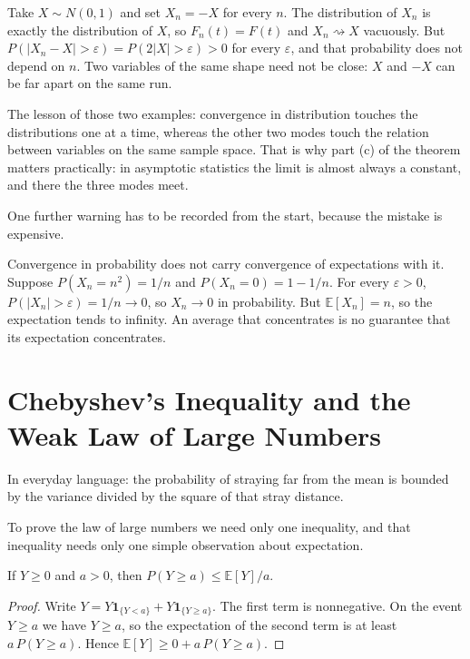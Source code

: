 \begin{contoh}
Take $X\sim N(0,1)$ and set $X_n=-X$ for every $n$. The distribution of $X_n$ is
exactly the distribution of $X$, so $F_n(t)=F(t)$ and $X_n\rightsquigarrow X$
vacuously. But $P(|X_n-X|>\varepsilon)=P(2|X|>\varepsilon)>0$ for every
$\varepsilon$, and that probability does not depend on $n$. Two variables of the
same shape need not be close: $X$ and $-X$ can be far apart on the same run.
\end{contoh}

The lesson of those two examples: convergence in distribution touches the
distributions one at a time, whereas the other two modes touch the relation between
variables on the same sample space. That is why part (c) of the theorem matters
practically: in asymptotic statistics the limit is almost always a constant, and
there the three modes meet.

One further warning has to be recorded from the start, because the mistake is
expensive.

\begin{catatan}
Convergence in probability does not carry convergence of expectations with it.
Suppose $P(X_n=n^2)=1/n$ and $P(X_n=0)=1-1/n$. For every $\varepsilon>0$,
$P(|X_n|>\varepsilon)=1/n\to0$, so $X_n\to0$ in probability. But
$\mathbb{E}[X_n]=n$, so the expectation tends to infinity. An average that
concentrates is no guarantee that its expectation concentrates.
\end{catatan}

\section{Chebyshev's Inequality and the Weak Law of Large Numbers}

In everyday language: the probability of straying far from the mean is bounded by
the variance divided by the square of that stray distance.

To prove the law of large numbers we need only one inequality, and that inequality
needs only one simple observation about expectation.

\begin{lemma}[Markov]
If $Y\ge0$ and $a>0$, then $P(Y\ge a)\le \mathbb{E}[Y]/a$.
\end{lemma}

\begin{proof}[Proof]
Write $Y=Y\mathbf{1}_{\{Y<a\}}+Y\mathbf{1}_{\{Y\ge a\}}$. The first term is
nonnegative. On the event $Y\ge a$ we have $Y\ge a$, so the expectation of the
second term is at least $a\,P(Y\ge a)$. Hence
$\mathbb{E}[Y]\ge 0+a\,P(Y\ge a)$.
\end{proof}

